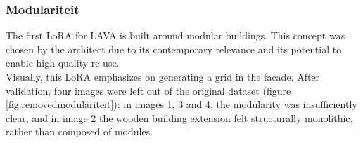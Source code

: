 \subsubsection{Modulariteit}
The first LoRA for LAVA is built around modular buildings. This concept was chosen by the architect due to its contemporary relevance and its potential to enable high-quality re-use.\\
Visually, this LoRA emphasizes on generating a grid in the facade.
After validation, four images were left out of the original dataset (figure \ref{fig:removedmodulariteit}): in images 1, 3 and 4, the modularity was insufficiently clear, and in image 2 the wooden building extension felt structurally monolithic, rather than composed of modules.
\begin{figure}[H]
  \centering
\end{figure}
